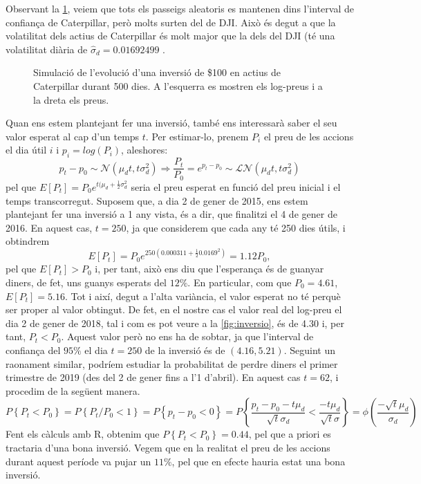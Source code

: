 \documentclass{article}
\numberwithin{table}{section}
\numberwithin{figure}{section}
\numberwithin{equation}{section}
\begin{document}
Observant la \cref{fig:simulacio}, veiem que tots els passeigs aleatoris es mantenen dins l'interval de confiança de Caterpillar, però molts surten del de DJI. Això és degut a que la volatilitat dels actius de Caterpillar és molt major que la dels del DJI (té una volatilitat diària de $\hat{\sigma}_d=0.01692499$ .
\begin{figure}[htb]
	\centering \sffamily \small
	
	\caption{Simulació de l'evolució d'una inversió de \$100 en actius de Caterpillar durant 500 dies. A l'esquerra es mostren els log-preus i a la dreta els preus.}
	\label{fig:simulacio}
\end{figure}
Quan ens estem plantejant fer una inversió, també ens interessarà saber el seu valor esperat al cap d’un temps $t$. Per estimar-lo, prenem $P_i$ el preu de les accions el dia útil $i$ i $p_i = log(P_i)$, aleshores:
\begin{equation}
  p_t-p_0\sim \mathcal{N}(\mu_d t, t\sigma_d^2)\Longrightarrow\frac{P_t}{P_0}=e^{p_t-p_0}\sim\mathcal{LN}(\mu_d t, t\sigma_d^2)
\end{equation}
pel que $E[P_t]=P_0e^{t(\mu_d+\frac{1}{2}\sigma_d^2}$ seria el preu esperat en funció del preu inicial i el temps transcorregut.
Suposem que, a dia 2 de gener de 2015, ens estem plantejant fer una inversió a 1 any vista, és a dir, que finalitzi el 4 de gener de 2016. En aquest cas, $t =250$, ja que considerem que cada any té 250 dies útils, i obtindrem
\begin{equation*}
  E[P_t]=P_0e^{250(0.000311+\frac{1}{2}0.0169^2)}=1.12P_0 ,
\end{equation*}
pel que $E[P_t]>P_0$ i, per tant, això ens diu que l’esperança és de guanyar diners, de fet, uns guanys esperats del $12\%$. 
En particular, com que $P_0 = 4.61$, $E[P_t] = 5.16$. Tot i així, degut a l’alta variància, el valor esperat no té perquè ser proper al valor obtingut. De fet, en el nostre cas el valor real del log-preu el dia 2 de gener de 2018, tal i com es pot veure a la \cref{fig:inversio}, és de 4.30 i, per tant, $P_t<P_0$. Aquest valor però no ens ha de sobtar, ja que l'interval de confiança del $95\%$ el dia $t=250$ de la inversió és de  $(4.16,5.21)$.
Seguint un raonament similar, podríem estudiar la probabilitat de perdre diners el primer trimestre de 2019 (des del 2 de gener fins a l'1 d'abril). En aquest cas $t=62$, i procedim de la següent manera.
\begin{equation}
  P\left\{P_t<P_0\right\}=P\left\{P_t/P_0<1\right\}=P\left\{p_t-p_0<0\right\}=P\left\{\frac{p_t-p_0-t\mu_d}{\sqrt{t}\sigma_d}<\frac{-t\mu_d}{\sqrt{t}\sigma}\right\}=\phi\left(\frac{-\sqrt{t}\mu_d}{\sigma_d}\right)
\end{equation}
Fent els càlculs amb R, obtenim que $P\left\{P_t<P_0\right\}=0.44$, pel que a priori es tractaria d'una bona inversió. Vegem que en la realitat el preu de les accions durant aquest període va pujar un $11\%$, pel que en efecte hauria estat una bona inversió.
\end{document}
